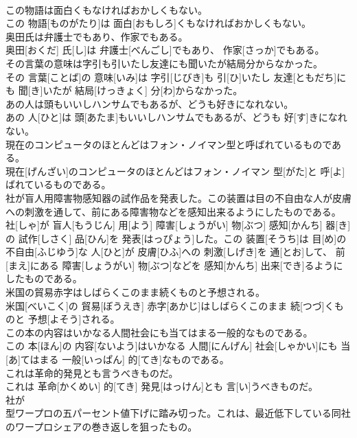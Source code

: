 \documentclass[8pt]{extreport}
\begin{document}
\begin{CJK}{UTF8}{min}
\\	この物語は面白くもなければおかしくもない。	
\\	この 物語[ものがたり]は 面白[おもしろ]くもなければおかしくもない。
\\	奥田氏は弁護士でもあり、作家でもある。	
\\	奥田[おくだ] 氏[し]は 弁護士[べんごし]でもあり、 作家[さっか]でもある。
\\	その言葉の意味は字引も引いたし友達にも聞いたが結局分からなかった。	
\\	その 言葉[ことば]の 意味[いみ]は 字引[じびき]も 引[ひ]いたし 友達[ともだち]にも 聞[き]いたが 結局[けっきょく] 分[わ]からなかった。
\\	あの人は頭もいいしハンサムでもあるが、どうも好きになれない。	
\\	あの 人[ひと]は 頭[あたま]もいいしハンサムでもあるが、どうも 好[す]きになれない。
\\	現在のコンピュータのほとんどはフォン・ノイマン型と呼ばれているものである。	
\\	現在[げんざい]のコンピュータのほとんどはフォン・ノイマン 型[がた]と 呼[よ]ばれているものである。
\\	社が盲人用障害物感知器の試作品を発表した。この装置は目の不自由な人が皮膚への刺激を通して、前にある障害物などを感知出来るようにしたものである。	
\\	社[しゃ]が 盲人[もうじん] 用[よう] 障害[しょうがい] 物[ぶつ] 感知[かんち] 器[き]の 試作[しさく] 品[ひん]を 発表[はっぴょう]した。この 装置[そうち]は 目[め]の 不自由[ふじゆう]な 人[ひと]が 皮膚[ひふ]への 刺激[しげき]を 通[とお]して、 前[まえ]にある 障害[しょうがい] 物[ぶつ]などを 感知[かんち] 出来[でき]るようにしたものである。
\\	米国の貿易赤字はしばらくこのまま続くものと予想される。	
\\	米国[べいこく]の 貿易[ぼうえき] 赤字[あかじ]はしばらくこのまま 続[つづ]くものと 予想[よそう]される。
\\	この本の内容はいかなる人間社会にも当てはまる一般的なものである。	
\\	この 本[ほん]の 内容[ないよう]はいかなる 人間[にんげん] 社会[しゃかい]にも 当[あ]てはまる 一般[いっぱん] 的[てき]なものである。
\\	これは革命的発見とも言うべきものだ。	
\\	これは 革命[かくめい] 的[てき] 発見[はっけん]とも 言[い]うべきものだ。
\\	社が
\\	型ワープロの五パーセント値下げに踏み切った。これは、最近低下している同社のワープロシェアの巻き返しを狙ったもの。	

\end{CJK}
\end{document}
